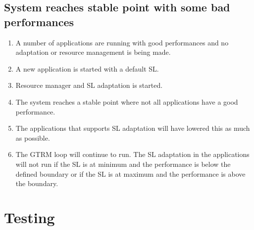 \documentclass[nobiblatex]{LTHthesis}
\begin{document}
\section{System reaches stable point with some bad performances}
\begin{enumerate}
\item A number of applications are running with good performances and no adaptation or resource management is being made.
\item A new application is started with a default SL.
\item Resource manager and SL adaptation is started.
\item The system reaches a stable point where not all applications have a good performance. 
\item The applications that supports SL adaptation will have lowered this as much as possible.
\item The GTRM loop will continue to run. The SL adaptation in the applications will not run if the SL is at minimum and the performance is below the defined boundary or if the SL is at maximum and the performance is above the boundary.
\end{enumerate}

\chapter{Testing}
\label{chp:test}
\end{document}

